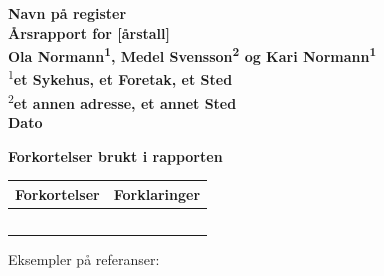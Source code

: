 \documentclass{article}
\begin{document}
    \begin{center}
        \textbf{Navn på register} \\
        \textbf{Årsrapport for [årstall]} \\
        \vspace{5mm}
        \textbf{Ola Normann\textsuperscript{1}, Medel Svensson\textsuperscript{2} og Kari Normann\textsuperscript{1}} \\
        \vspace{15mm}
        \textsuperscript{1}\textbf{et Sykehus, et Foretak, et Sted} \\
        \vspace{5mm}
        \textsuperscript{2}\textbf{et annen adresse, et annet Sted} \\
        \vspace{5mm}
        \textbf{Dato}
    \end{center}
    
    \newpage
    
    \tableofcontents
    \newpage
    
    \textbf{\color{headline}\large Forkortelser brukt i rapporten}
    
    \begin{center}
        \begin{tabularx}{\linewidth}{| p{4cm} | X |}
            \hline 
            Forkortelser & Forklaringer \\ \hline
            & \\ \hline
            & \\ \hline
            & \\ \hline
            & \\ \hline
            & \\ \hline
        \end{tabularx}
    \end{center}
    
    \newpage
    

    
    Eksempler på referanser: 
    \autocite{eksempel1}
    \textcite{eksempel2}
    \autocite{eksempel1, eksempel2}
\end{document}
